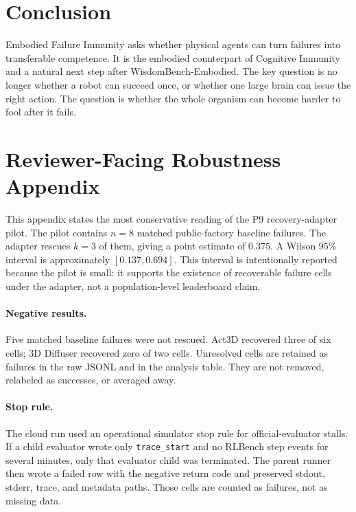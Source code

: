 \documentclass[11pt]{article}
\begin{document}
\section{Conclusion}

Embodied Failure Immunity asks whether physical agents can turn failures into transferable competence.
It is the embodied counterpart of Cognitive Immunity and a natural next step after WisdomBench-Embodied.
The key question is no longer whether a robot can succeed once, or whether one large brain can issue the right action.
The question is whether the whole organism can become harder to fool after it fails.

\appendix

\section{Reviewer-Facing Robustness Appendix}
\label{app:robustness}

This appendix states the most conservative reading of the P9 recovery-adapter pilot.
The pilot contains $n=8$ matched public-factory baseline failures.
The adapter rescues $k=3$ of them, giving a point estimate of $0.375$.
A Wilson 95\% interval is approximately $[0.137,0.694]$.
This interval is intentionally reported because the pilot is small: it supports the existence of recoverable failure cells under the adapter, not a population-level leaderboard claim.

\paragraph{Negative results.}
Five matched baseline failures were not rescued.
Act3D recovered three of six cells; 3D Diffuser recovered zero of two cells.
Unresolved cells are retained as failures in the raw JSONL and in the analysis table.
They are not removed, relabeled as successes, or averaged away.

\paragraph{Stop rule.}
The cloud run used an operational simulator stop rule for official-evaluator stalls.
If a child evaluator wrote only \texttt{trace\_start} and no RLBench step events for several minutes, only that evaluator child was terminated.
The parent runner then wrote a failed row with the negative return code and preserved stdout, stderr, trace, and metadata paths.
Those cells are counted as failures, not as missing data.
\end{document}

